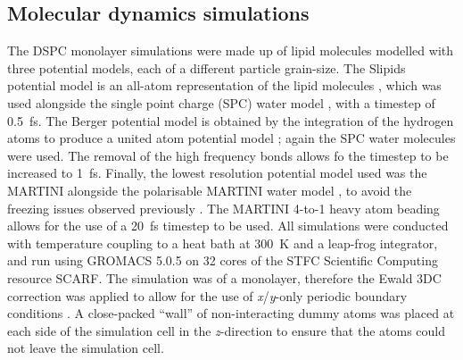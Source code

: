 \documentclass[amsmath,amssymb,twocolumn,superscriptaddress]{revtex4-1}
\begin{document}
\subsection{Molecular dynamics simulations}
The DSPC monolayer simulations were made up of lipid molecules modelled with three potential models, each of a different particle grain-size.
The Slipids potential model is an all-atom representation of the lipid molecules \cite{Jambeck2012}, which was used alongside the single point charge (SPC) water model \cite{Berendsen1987}, with a timestep of \SI{0.5}{\femto\second}.
The Berger potential model is obtained by the integration of the hydrogen atoms to produce a united atom potential model \cite{Berger1997}; again the SPC water molecules were used.
The removal of the high frequency  bonds allows fo the timestep to be increased to \SI{1}{\femto\second}.
Finally, the lowest resolution potential model used was the MARTINI \cite{Marrink2007} alongside the polarisable MARTINI water model \cite{Yesylevskyy2010}, to avoid the freezing issues observed previously \cite{Koutsioubas2016}.
The MARTINI 4-to-1 heavy atom beading allows for the use of a \SI{20}{\femto\second} timestep to be used.
All simulations were conducted with temperature coupling to a heat bath at \SI{300}{\kelvin} and a leap-frog integrator, and run using GROMACS 5.0.5 \cite{Berendsen1995,Lindahl2001,vanderSpoel2005,Hess2008} on 32 cores of the STFC Scientific Computing resource SCARF.
The simulation was of a monolayer, therefore the Ewald 3DC correction was applied to allow for the use of \emph{x}/\emph{y}-only periodic boundary conditions \cite{InChul1999}.
A close-packed ``wall'' of non-interacting dummy atoms was placed at each side of the simulation cell in the \emph{z}-direction to ensure that the atoms could not leave the simulation cell.
\end{document}

